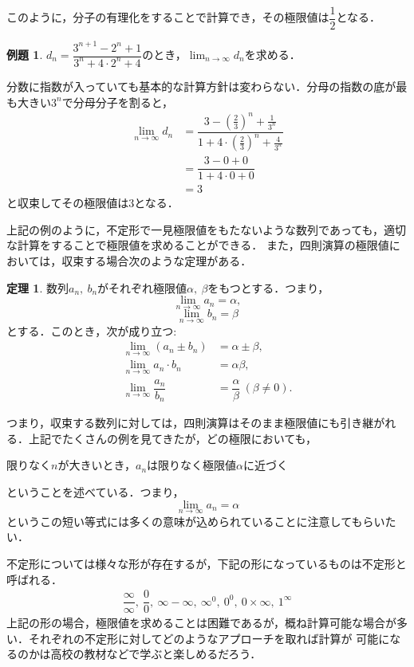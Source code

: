 \documentclass[a4paper,12pt,autodetect-engine,dvipdfmx]{jsarticle}
\theoremstyle{definition}
\newtheorem{exa}[dfn]{例題}
\newtheorem{thm}[dfn]{定理}
\begin{document}
このように，分子の有理化をすることで計算でき，その極限値は$\dfrac{1}{2}$となる．
\begin{exa}
    $d_{n} = \dfrac{3^{n+1} - 2 ^{n} + 1}{3^{n} + 4 \cdot 2^{n} + 4}$のとき，$\displaystyle \lim_{n \to \infty}d_{n}$を求める．
\end{exa}
分数に指数が入っていても基本的な計算方針は変わらない．分母の指数の底が最も大きい$3^n$で分母分子を割ると，
\begin{align*}
    \lim_{n \to \infty}d_{n} &= \dfrac{3 - \left(\frac{2}{3}\right)^{n} + \frac{1}{3^n}}{1 + 4\cdot \left(\frac{2}{3}\right)^{n} + \frac{4}{3 ^ n}}\\
                             &= \dfrac{3 - 0 + 0}{1 + 4\cdot 0 + 0}\\
                             &= 3
\end{align*}
と収束してその極限値は3となる．

上記の例のように，不定形で一見極限値をもたないような数列であっても，適切な計算をすることで極限値を求めることができる．
また，四則演算の極限値においては，収束する場合次のような定理がある．
\begin{thm}\label{thm.2.7}
    数列$a_{n},\ b_{n}$がそれぞれ極限値$\alpha,\ \beta$をもつとする．つまり，
    $$\lim_{n \to \infty}a_{n} = \alpha,$$
    $$\lim_{n \to \infty}b_{n} = \beta$$
    とする．このとき，次が成り立つ:
    \begin{align*}
        \lim_{n \to \infty}(a_{n} \pm b_{n}) &= \alpha \pm \beta,\\
        \lim_{n \to \infty}a_{n} \cdot b_{n} &= \alpha \beta,\\
        \lim_{n \to \infty}\dfrac{a_{n}}{b_{n}} &= \dfrac{\alpha}{\beta}\ (\beta \neq 0).
    \end{align*}
\end{thm}
つまり，収束する数列に対しては，四則演算はそのまま極限値にも引き継がれる．上記でたくさんの例を見てきたが，どの極限においても，
\begin{center}
    限りなく$n$が大きいとき，$a_{n}$は限りなく極限値$\alpha$に近づく
\end{center}
ということを述べている．つまり，
$$\lim_{n \to \infty}a_{n} = \alpha$$
というこの短い等式には多くの意味が込められていることに注意してもらいたい．

不定形については様々な形が存在するが，下記の形になっているものは不定形と呼ばれる．
\begin{align*}
    \dfrac{\infty}{\infty},\ \dfrac{0}{0},\ \infty - \infty,\ {\infty}^{0},\ {0}^{0},\ 0 \times \infty,\ 1 ^ {\infty}
\end{align*}
上記の形の場合，極限値を求めることは困難であるが，概ね計算可能な場合が多い．それぞれの不定形に対してどのようなアプローチを取れば計算が
可能になるのかは高校の教材などで学ぶと楽しめるだろう．
\end{document}
